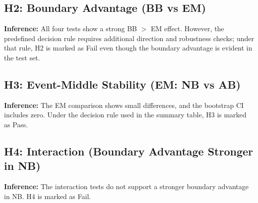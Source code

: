 \documentclass[11pt]{article}
\begin{document}
\subsection{H2: Boundary Advantage (BB vs EM)}
\begin{table}[htbp]
\centering
\caption{H2 tests}
\end{table}
\textbf{Inference:} All four tests show a strong BB $>$ EM effect. However, the predefined decision rule requires additional direction and robustness checks; under that rule, H2 is marked as Fail even though the boundary advantage is evident in the test set.

\subsection{H3: Event-Middle Stability (EM: NB vs AB)}
\begin{table}[htbp]
\centering
\caption{H3 tests}
\end{table}
\textbf{Inference:} The EM comparison shows small differences, and the bootstrap CI includes zero. Under the decision rule used in the summary table, H3 is marked as Pass.

\subsection{H4: Interaction (Boundary Advantage Stronger in NB)}
\begin{table}[htbp]
\centering
\caption{H4 tests}
\end{table}
\textbf{Inference:} The interaction tests do not support a stronger boundary advantage in NB. H4 is marked as Fail.
\end{document}
